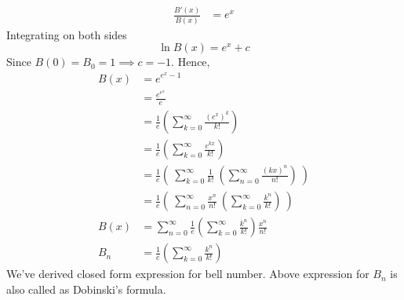 \begin{enumerate}
\begin{align*}
     \frac{B'(x)}{B(x)} &= e^x
 \end{align*}
 Integrating on both sides 
 $$\ln{B(x)} = e^x + c$$
 Since $B(0) = B_0 = 1 \implies c = -1$. Hence,
 \begin{align*}
     B(x) &= e^{e^x - 1} \\
     &= \frac{e^{e^x}}{e} \\
     &= \frac{1}{e} (\sum_{k=0}^{\infty} \frac{(e^x)^k}{k!}) \\
     &= \frac{1}{e} (\sum_{k=0}^{\infty} \frac{e^{kx}}{k!}) \\
     &= \frac{1}{e} (~\sum_{k=0}^{\infty} \frac{1}{k!}~ (\sum_{n=0}^{\infty} \frac{(kx)^n}{n!})~) \\
     &= \frac{1}{e} (~\sum_{n=0}^{\infty} \frac{x^n}{n!}~ (\sum_{k=0}^{\infty} \frac{k^n}{k!})~)\\
B(x)&= \sum_{n=0}^{\infty} \frac{1}{e} (\sum_{k=0}^{\infty} \frac{k^n}{k!}) \frac{x^n}{n!} \\
    B_n &= \frac{1}{e} (\sum_{k=0}^{\infty} \frac{k^n}{k!})
 \end{align*}
 We've derived closed form expression for bell number. Above expression for $B_n$ is also called as Dobinski's formula.
 
\end{enumerate}
